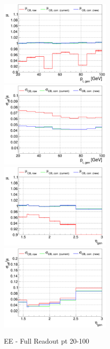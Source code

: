 \begin{figure}
\includegraphics[width=0.495\textwidth]{./plots_pdf/ECAL_plots/plotsNoPU/EE/pdf/FULL/GENPT/EEFULL_GENPT_0020_0100_MuOverBins.pdf}
\includegraphics[width=0.495\textwidth]{./plots_pdf/ECAL_plots/plotsNoPU/EE/pdf/FULL/GENPT/EEFULL_GENPT_0020_0100_EffSigmaOverBins.pdf}
\includegraphics[width=0.495\textwidth]{./plots_pdf/ECAL_plots/plotsNoPU/EE/pdf/FULL/GENETA/EEFULL_GENETA_0020_0100_MuOverBins.pdf}
\includegraphics[width=0.495\textwidth]{./plots_pdf/ECAL_plots/plotsNoPU/EE/pdf/FULL/GENETA/EEFULL_GENETA_0005_0020_EffSigmaOverBins.pdf}
\caption{EE - Full Readout pt 20-100}
\end{figure}



